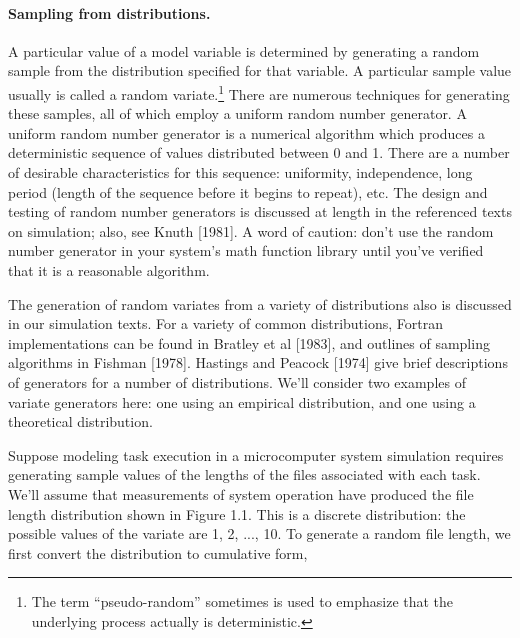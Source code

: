 \paragraph{Sampling from distributions.}
A particular value of a model variable is determined by generating a random
sample from the distribution specified for that variable. A particular sample
value usually is called a random variate.\footnote{The term ``pseudo-random''
sometimes is used to emphasize that the underlying process actually is
deterministic.} There are numerous techniques for generating these samples, all
of which employ a uniform random number generator. A uniform random number
generator is a numerical algorithm which produces a deterministic sequence of
values distributed between 0 and 1. There are a number of desirable
characteristics for this sequence: uniformity, independence, long period
(length of the sequence before it begins to repeat), etc. The design and
testing of random number generators is discussed at length in the referenced
texts on simulation; also, see Knuth [1981]. A word of caution: don't use the
random number generator in your system's math function library until you've
verified that it is a reasonable algorithm.

The generation of random variates from a variety of distributions also is
discussed in our simulation texts. For a variety of common distributions,
Fortran implementations can be found in Bratley et al [1983], and outlines of
sampling algorithms in Fishman [1978]. Hastings and Peacock [1974] give brief
descriptions of generators for a number of distributions. We'll consider two
examples of variate generators here: one using an empirical distribution, and
one using a theoretical distribution.

Suppose modeling task execution in a microcomputer system simulation requires
generating sample values of the lengths of the files associated with each task.
We'll assume that measurements of system operation have produced the file
length distribution shown in Figure 1.1. This is a discrete distribution: the
possible values of the variate are 1, 2, ..., 10. To generate a random file
length, we first convert the distribution to cumulative form,


